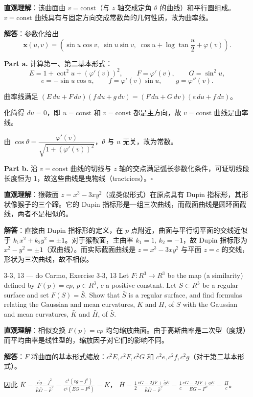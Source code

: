 \begin{solution}
\textbf{直观理解}：该曲面由 $v = \mathrm{const}$（与 $z$ 轴交成定角 $\theta$ 的曲线）和平行圆组成。$v = \mathrm{const}$ 曲线具有与固定方向交成常数角的几何性质，故为曲率线。

\textbf{解答}：参数化给出
\[
\mathbf{x}(u,v) = (\sin u\cos v,\; \sin u\sin v,\; \cos u + \log\tan\frac{u}{2} + \varphi(v)).
\]

\textbf{Part a.} 计算第一、第二基本形式：
\[
E = 1 + \cot^2 u + (\varphi'(v))^2,\qquad F = \varphi'(v),\qquad G = \sin^2 u,
\]
\[
e = -\sin u\cos u,\qquad f = \varphi'(v)\sin u,\qquad g = \varphi''(v).
\]

曲率线满足 $(E\,du + F\,dv)(f\,du + g\,dv) = (F\,du + G\,dv)(e\,du + f\,dv)$。

化简得 $du = 0$，即 $u = \mathrm{const}$ 和 $v = \mathrm{const}$ 都是主方向，故 $v = \mathrm{const}$ 曲线是曲率线。

由 $\cos\theta = \dfrac{\varphi'(v)}{\sqrt{1+(\varphi'(v))^2}}$，$\theta$ 与 $u$ 无关，故为常数。

\textbf{Part b.} 沿 $v = \mathrm{const}$ 曲线的切线与 $z$ 轴的交点满足弧长参数化条件，可证切线段长度恒为 1，故这些曲线是曳物线（tractrices）。$\square$
\end{solution}

\begin{solution}
\textbf{直观理解}：猴鞍面 $z = x^3 - 3xy^2$（或类似形式）在原点具有 Dupin 指标形，其形状像猴子的三个蹄。它的 Dupin 指标形是一组三次曲线，而截面曲线是圆环面截线，两者不是相似的。

\textbf{解答}：直接由 Dupin 指标形的定义，在 $p$ 点附近，曲面与平行切平面的交线近似于 $k_1 x^2 + k_2 y^2 = \pm 1$。对于猴鞍面，主曲率 $k_1 = 1$, $k_2 = -1$，故 Dupin 指标形为 $x^2 - y^2 = \pm 1$（双曲线）。而实际截面曲线是 $z = x^3 - 3xy^2$ 与平面 $z = c$ 的交线，形状为三次曲线，故不相似。
\end{solution}

\begin{exercise}{3-3, 13 — do Carmo, Exercise 3-3, 13}
Let $F \colon R^3 \to R^3$ be the map (a similarity) defined by $F(p) = cp$, $p \in R^3$, $c$ a positive constant. Let $S \subset R^3$ be a regular surface and set $F(S) = \bar{S}$. Show that $\bar{S}$ is a regular surface, and find formulas relating the Gaussian and mean curvatures, $K$ and $H$, of $S$ with the Gaussian and mean curvatures, $\bar{K}$ and $\bar{H}$, of $\bar{S}$.
\end{exercise}

\begin{solution}
\textbf{直观理解}：相似变换 $F(p) = cp$ 均匀缩放曲面。由于高斯曲率是二次型（度规）而平均曲率是线性型的，缩放因子对它们的影响不同。

\textbf{解答}：$F$ 将曲面的基本形式缩放：$c^2 E, c^2 F, c^2 G$ 和 $c^2 e, c^2 f, c^2 g$（对于第二基本形式）。

因此 $\bar{K} = \frac{\bar{eg} - \bar{f}^2}{\bar{E}\bar{G} - \bar{F}^2} = \frac{c^4(eg-f^2)}{c^4(EG-F^2)} = K$，
$\bar{H} = \frac{1}{2}\frac{\bar{e}\bar{G} - 2\bar{f}\bar{F} + \bar{g}\bar{E}}{\bar{E}\bar{G} - \bar{F}^2} = \frac{1}{c}\frac{eG - 2fF + gE}{EG - F^2} = \frac{H}{c}$。
\end{solution}

